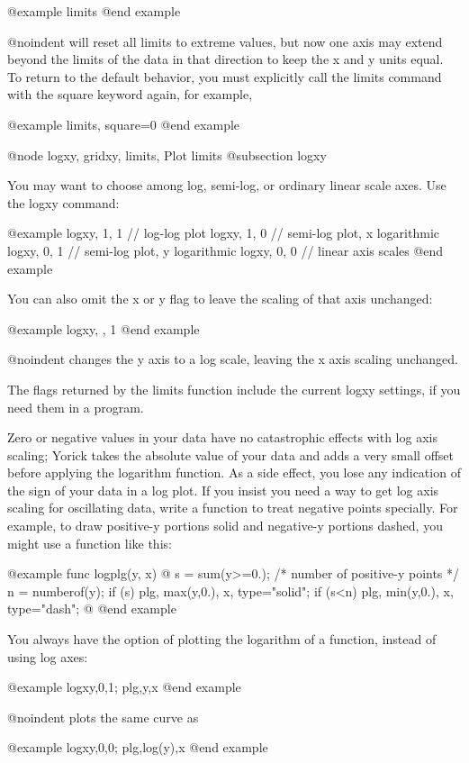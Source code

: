 @example
limits
@end example

@noindent
will reset all limits to extreme values, but now one axis may extend
beyond the limits of the data in that direction to keep the x and y
units equal.  To return to the default behavior, you must explicitly
call the limits command with the square keyword again, for example,

@example
limits, square=0
@end example

@node logxy, gridxy, limits, Plot limits
@subsection logxy

You may want to choose among log, semi-log, or ordinary linear scale
axes.  Use the logxy command:

@example
logxy, 1, 1       // log-log plot
logxy, 1, 0       // semi-log plot, x logarithmic
logxy, 0, 1       // semi-log plot, y logarithmic
logxy, 0, 0       // linear axis scales
@end example

You can also omit the x or y flag to leave the scaling of that axis
unchanged:

@example
logxy, , 1
@end example

@noindent
changes the y axis to a log scale, leaving the x axis scaling
unchanged.

The flags returned by the limits function include the current logxy
settings, if you need them in a program.

Zero or negative values in your data have no catastrophic effects with
log axis scaling; Yorick takes the absolute value of your data and
adds a very small offset before applying the logarithm function.  As a
side effect, you lose any indication of the sign of your data in a log
plot.  If you insist you need a way to get log axis scaling for
oscillating data, write a function to treat negative points specially.
For example, to draw positive-y portions solid and negative-y portions
dashed, you might use a function like this:

@example
func logplg(y, x)
@{
  s = sum(y>=0.);  /* number of positive-y points */
  n = numberof(y);
  if (s) plg, max(y,0.), x, type="solid";
  if (s<n) plg, min(y,0.), x, type="dash";
@}
@end example

You always have the option of plotting the logarithm of a function,
instead of using log axes:

@example
logxy,0,1; plg,y,x
@end example

@noindent
plots the same curve as

@example
logxy,0,0; plg,log(y),x
@end example

